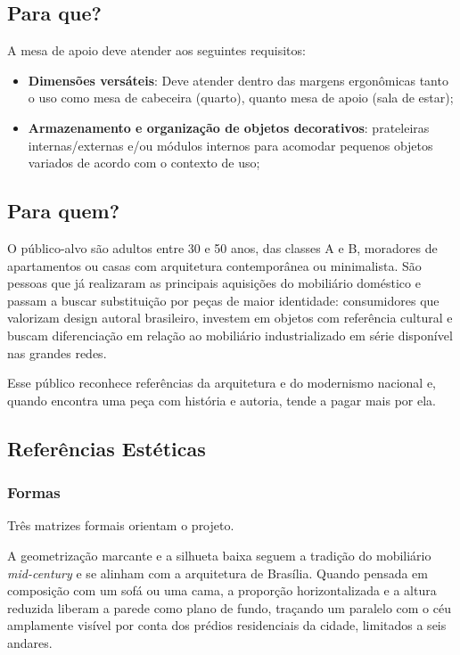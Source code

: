 \documentclass[
  12pt,
  a4paper,
  oneside,
  brazil
]{article}
\begin{document}
\subsection{Para que?}

A mesa de apoio deve atender aos seguintes requisitos:

\begin{itemize}
  \item \textbf{Dimensões versáteis}: Deve atender dentro das margens
    ergonômicas tanto o uso como mesa de cabeceira (quarto), quanto mesa
    de apoio (sala de estar);
  \item \textbf{Armazenamento e organização de objetos decorativos}: prateleiras
    internas/externas e/ou módulos internos para acomodar pequenos objetos
    variados de acordo com o contexto de uso;
\end{itemize}

\subsection{Para quem?}

O público-alvo são adultos entre 30 e 50 anos, das classes A e B, moradores
de apartamentos ou casas com arquitetura contemporânea ou minimalista.
São pessoas que já realizaram as principais aquisições do mobiliário doméstico
e passam a buscar substituição por peças de maior identidade: consumidores
que valorizam design autoral brasileiro, investem em objetos com referência
cultural e buscam diferenciação em relação ao mobiliário industrializado em
série disponível nas grandes redes.

Esse público reconhece referências da arquitetura e do modernismo nacional
e, quando encontra uma peça com história e autoria, tende a pagar mais por ela.

\subsection{Referências Estéticas}

\subsubsection{Formas}

Três matrizes formais orientam o projeto.

A geometrização marcante e a silhueta baixa seguem a tradição do mobiliário
\textit{mid-century} e se alinham com a arquitetura de Brasília. Quando
pensada em composição com um sofá ou uma cama, a proporção horizontalizada
e a altura reduzida liberam a parede como plano de fundo, traçando um paralelo
com o céu amplamente visível por conta dos prédios residenciais da cidade,
limitados a seis andares.
\end{document}
